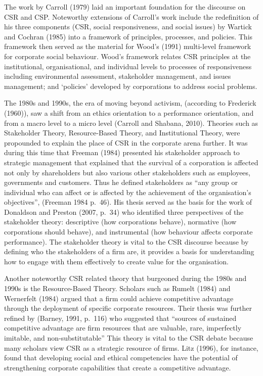 \documentclass[
]{mitthesis}
\begin{document}
The work by Carroll (1979) laid an important foundation for the discourse on CSR and CSP. Noteworthy extensions of Carroll's work include the redefinition of his three components (CSR, social responsiveness, and social issues) by Wartick and Cochran (1985) into a framework of principles, processes, and policies. This framework then served as the material for Wood's (1991) multi-level framework for corporate social behaviour. Wood's framework relates CSR principles at the institutional, organisational, and individual levels to processes of responsiveness including environmental assessment, stakeholder management, and issues management; and `policies' developed by corporations to address social problems.

The 1980s and 1990s, the era of moving beyond activism, (according to Frederick (1960)), saw a shift from an ethics orientation to a performance orientation, and from a macro level to a micro level (Carroll and Shabana, 2010). Theories such as Stakeholder Theory, Resource-Based Theory, and Institutional Theory, were propounded to explain the place of CSR in the corporate arena further. It was during this time that Freeman (1984) presented his stakeholder approach to strategic management that explained that the survival of a corporation is affected not only by shareholders but also various other stakeholders such as employees, governments and customers. Thus he defined stakeholders as ``any group or individual who can affect or is affected by the achievement of the organisation's objectives'', (Freeman 1984 p.~46). His thesis served as the basis for the work of Donaldson and Preston (2007, p.~34) who identified three perspectives of the stakeholder theory: descriptive (how corporations behave), normative (how corporations should behave), and instrumental (how behaviour affects corporate performance). The stakeholder theory is vital to the CSR discourse because by defining who the stakeholders of a firm are, it provides a basis for understanding how to engage with them effectively to create value for the organisation.

Another noteworthy CSR related theory that burgeoned during the 1980s and 1990s is the Resource-Based Theory. Scholars such as Rumelt (1984) and Wernerfelt (1984) argued that a firm could achieve competitive advantage through the deployment of specific corporate resources. Their thesis was further refined by (Barney, 1991, p.~116) who suggested that ``sources of sustained competitive advantage are firm resources that are valuable, rare, imperfectly imitable, and non-substitutable'' This theory is vital to the CSR debate because many scholars view CSR as a strategic resource of firms. Litz (1996), for instance, found that developing social and ethical competencies have the potential of strengthening corporate capabilities that create a competitive advantage.
\end{document}
